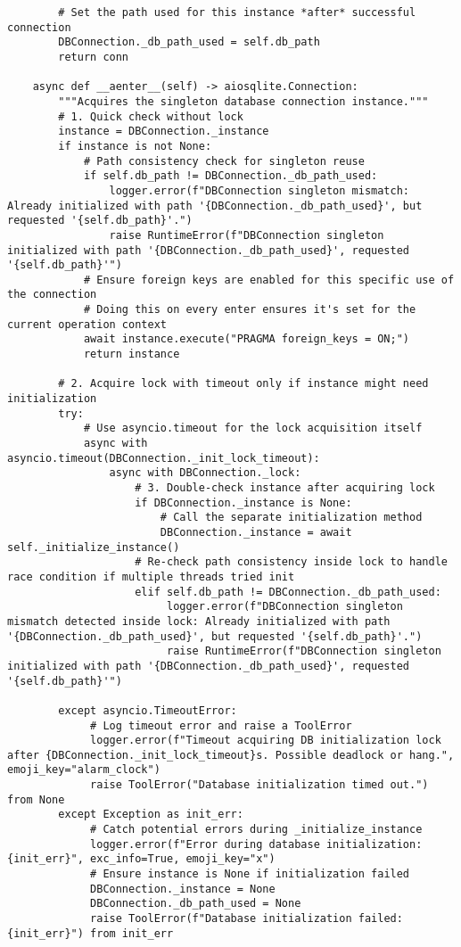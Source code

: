 \documentclass[12pt,a4paper]{article}
\begin{document}
\begin{pageablecode}
\begin{verbatim}
        # Set the path used for this instance *after* successful connection
        DBConnection._db_path_used = self.db_path
        return conn

    async def __aenter__(self) -> aiosqlite.Connection:
        """Acquires the singleton database connection instance."""
        # 1. Quick check without lock
        instance = DBConnection._instance
        if instance is not None:
            # Path consistency check for singleton reuse
            if self.db_path != DBConnection._db_path_used:
                logger.error(f"DBConnection singleton mismatch: Already initialized with path '{DBConnection._db_path_used}', but requested '{self.db_path}'.")
                raise RuntimeError(f"DBConnection singleton initialized with path '{DBConnection._db_path_used}', requested '{self.db_path}'")
            # Ensure foreign keys are enabled for this specific use of the connection
            # Doing this on every enter ensures it's set for the current operation context
            await instance.execute("PRAGMA foreign_keys = ON;")
            return instance

        # 2. Acquire lock with timeout only if instance might need initialization
        try:
            # Use asyncio.timeout for the lock acquisition itself
            async with asyncio.timeout(DBConnection._init_lock_timeout):
                async with DBConnection._lock:
                    # 3. Double-check instance after acquiring lock
                    if DBConnection._instance is None:
                        # Call the separate initialization method
                        DBConnection._instance = await self._initialize_instance()
                    # Re-check path consistency inside lock to handle race condition if multiple threads tried init
                    elif self.db_path != DBConnection._db_path_used:
                         logger.error(f"DBConnection singleton mismatch detected inside lock: Already initialized with path '{DBConnection._db_path_used}', but requested '{self.db_path}'.")
                         raise RuntimeError(f"DBConnection singleton initialized with path '{DBConnection._db_path_used}', requested '{self.db_path}'")

        except asyncio.TimeoutError:
             # Log timeout error and raise a ToolError
             logger.error(f"Timeout acquiring DB initialization lock after {DBConnection._init_lock_timeout}s. Possible deadlock or hang.", emoji_key="alarm_clock")
             raise ToolError("Database initialization timed out.") from None
        except Exception as init_err:
             # Catch potential errors during _initialize_instance
             logger.error(f"Error during database initialization: {init_err}", exc_info=True, emoji_key="x")
             # Ensure instance is None if initialization failed
             DBConnection._instance = None
             DBConnection._db_path_used = None
             raise ToolError(f"Database initialization failed: {init_err}") from init_err


\end{verbatim}
\end{pageablecode}
\end{document}
